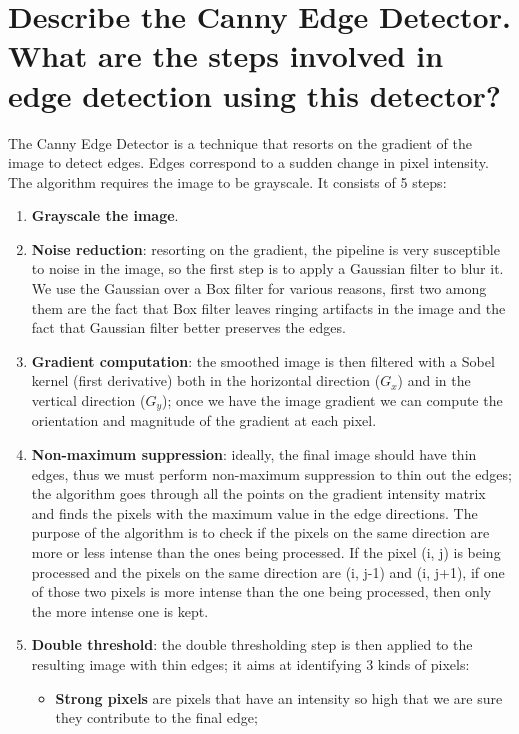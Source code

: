 \documentclass{article}
\begin{document}
\newpage

\section{Describe the Canny Edge Detector. What are the steps involved in edge detection using this detector?}

The Canny Edge Detector is a technique that resorts on the gradient of the image to detect
edges. Edges correspond to a sudden change in pixel intensity. The algorithm requires the image to be grayscale. It consists of 5 steps:

\begin{enumerate}[start=0]
    \item \textbf{Grayscale the image}.
    \item \textbf{Noise reduction}: resorting on the gradient, the pipeline is very susceptible to noise in the image, so the first step is to apply a Gaussian filter to blur it. We use the Gaussian over a Box filter for various reasons, first two among them are the fact that Box filter leaves ringing artifacts in the image and the fact that Gaussian filter better preserves the edges.
    \item \textbf{Gradient computation}: the smoothed image is then filtered with a Sobel kernel (first derivative) both in the horizontal direction ($G_x$) and in the vertical direction ($G_y$); once we have the image gradient we can compute the orientation and magnitude of the gradient at each pixel.
    \item \textbf{Non-maximum suppression}: ideally, the final image should have thin edges, thus we must perform non-maximum suppression to thin out the edges; the algorithm goes through all the points on the gradient intensity matrix and finds the pixels with the maximum value in the edge directions. The purpose of the algorithm is to check if the pixels on the same direction are more or less intense than the ones being processed. If the pixel (i, j) is being processed and the pixels on the same direction are (i, j-1) and (i, j+1), if one of those two pixels is more intense than the one being processed, then only the more intense one is kept.
    \item \textbf{Double threshold}: the double thresholding step is then applied to the resulting image with thin edges;
    it aims at identifying 3 kinds of pixels:
    \begin{itemize}
        \item \textbf{Strong pixels} are pixels that have an intensity so high that we are sure they contribute to the final edge;

\end{itemize}
\end{enumerate}
\end{document}
